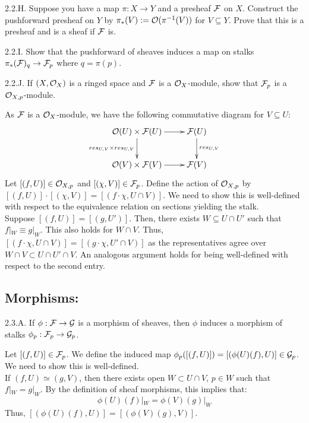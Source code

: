 \begin{exercise}{2.2.H.} 
    Suppose you have a map $\pi: X \to Y$ and a presheaf $\mathcal{F}$ on $X$. Construct the pushforward presheaf on $Y$ by $\pi_*(V) := \mathcal{O}(\pi^{-1}(V))$ for $V \subseteq Y$. Prove that this is a presheaf and is a sheaf if $\mathcal{F}$ is.
\end{exercise}
\begin{solution}
    \todo{}
\end{solution}

\begin{exercise}{2.2.I.} 
    Show that the pushforward of sheaves induces a map on stalks $\pi_*(\mathcal{F})_{q} \to \mathcal{F}_p$ where $q = \pi(p)$. 
\end{exercise}
\begin{solution}
    \todo{}
\end{solution}

\begin{exercise}{2.2.J.} 
    If $(X, \mathcal{O}_X)$ is a ringed space and $\mathcal{F}$ is a $\mathcal{O}_X$-module, show that $\mathcal{F}_p$ is a $\mathcal{O}_{X, p}$-module.
\end{exercise}
\begin{solution}
    As $\mathcal{F}$ is a $\mathcal{O}_X$-module, we have the following commutative diagram for $V \subseteq U$:
    \[
    \xymatrix{
    \OO(U) \times \FF(U) \ar[r] \ar[d]_{res_{U,V} \times res_{U,V}} & \FF(U) \ar[d]^{res_{U,V}} \\
    \OO(V) \times \FF(V) \ar[r] &\FF(V)
    }
    \]
    Let $[(f, U)] \in \mathcal{O}_{X,p}$ and $[(\chi, V)] \in \mathcal{F}_p$. Define the action of $\mathcal{O}_{X,p}$ by $[(f,U)] \cdot [(\chi, V)] = [(f \cdot \chi, U \cap V)]$. We need to show this is well-defined with respect to the equivalence relation on sections yielding the stalk. \\
    Suppose $[(f, U)] = [(g, U')] $. Then, there exists $W \subseteq U \cap U'$ such that $f|_W \equiv g|_W$. This also holds for $W \cap V$. Thus, $[(f \cdot \chi, U \cap V)] = [(g \cdot \chi, U' \cap V)]$ as the representatives agree over $W \cap V \subset U \cap U' \cap V$. An analogous argument holds for being well-defined with respect to the second entry.  
\end{solution}

\subsection{Morphisms:}
\begin{exercise}{2.3.A.} 
    If $\phi: \mathcal{F} \to \mathcal{G}$ is a morphism of sheaves, then $\phi$ induces a morphism of stalks $\phi_p: \mathcal{F}_p \to \mathcal{G}_p$. 
\end{exercise}
\begin{solution}
    Let $[(f, U)] \in \mathcal{F}_p$. We define the induced map $\phi_p([(f, U)]) = [(\phi(U)(f), U)] \in \mathcal{G}_p$. We need to show this is well-defined. \\
    If $(f, U) \simeq (g, V)$, then there exists open $W \subset U \cap V$, $p \in W$ such that $f|_W = g|_W$. By the definition of sheaf morphisms, this implies that:
    \[ \phi(U)(f)|_W = \phi(V)(g)|_W\]
    Thus, $[(\phi(U)(f), U)] = [(\phi(V)(g), V)]$. 
\end{solution}

